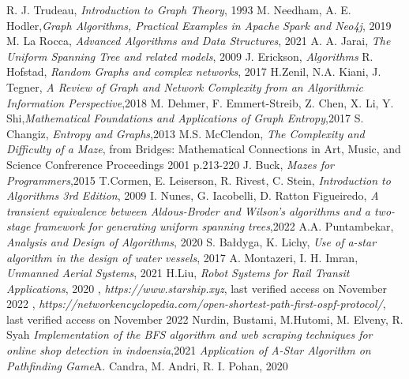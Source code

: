 
\begin{thebibliography}{100}

R. J. Trudeau, \emph{Introduction to Graph Theory}, 1993
M. Needham, A. E. Hodler,\emph{Graph Algorithms, Practical Examples in Apache Spark and Neo4j}, 2019
M. La Rocca, \emph{Advanced Algorithms and Data Structures}, 2021 
A. A. Jarai, \emph{The Uniform Spanning Tree and related models}, 2009
 J. Erickson, \emph{Algorithms}
R. Hofstad, \emph{Random Graphs and complex networks}, 2017
H.Zenil, N.A. Kiani, J. Tegner, \emph{A Review of Graph and Network Complexity from an Algorithmic Information Perspective},2018
M. Dehmer, F. Emmert-Streib, Z. Chen, X. Li, Y. Shi,\emph{Mathematical Foundations and Applications of Graph Entropy},2017
S. Changiz, \emph{Entropy and Graphs},2013
M.S. McClendon, \emph{The Complexity and Difficulty of a Maze}, from Bridges: Mathematical Connections in Art, Music, and Science Confrerence Proceedings 2001 p.213-220
J. Buck, \emph{Mazes for Programmers},2015
T.Cormen, E. Leiserson, R. Rivest, C. Stein, \emph{Introduction to Algorithms 3rd Edition}, 2009
I. Nunes, G. Iacobelli, D. Ratton Figueiredo, \emph{A transient equivalence between Aldous-Broder and Wilson's algorithms and a two-stage framework for generating uniform spanning trees},2022
A.A. Puntambekar, \emph{Analysis and Design of Algorithms}, 2020 
S. Bałdyga, K. Lichy, \emph{Use of a-star algorithm in the design of water vessels}, 2017
A. Montazeri, I. H. Imran, \emph{Unmanned Aerial Systems}, 2021
H.Liu, \emph{Robot Systems for Rail Transit Applications}, 2020
, \emph{https://www.starship.xyz}, last verified access on November 2022
, \emph{https://networkencyclopedia.com/open-shortest-path-first-ospf-protocol/}, last verified access on November 2022
Nurdin, Bustami, M.Hutomi, M. Elveny, R. Syah \emph{Implementation of the BFS algorithm and web scraping techniques for online shop detection in indoensia},2021
 \emph{Application of A-Star Algorithm on Pathfinding Game}A. Candra, M. Andri, R. I. Pohan, 2020 



\end{thebibliography}
